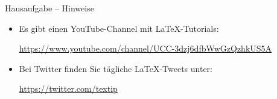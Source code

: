\begin{frame}{Hausaufgabe -- Hinweise}

\begin{itemize}
	
	\item Es gibt einen YouTube-Channel mit \LaTeX -Tutorials:
	
	 \url{https://www.youtube.com/channel/UCC-3dzj6dfbWwGzQzhkUS5A}
	
	\item Bei Twitter finden Sie tägliche \LaTeX -Tweets unter:
	
	\url{https://twitter.com/textip}
	
\end{itemize}

\end{frame}




%
%
%



%
%
%


